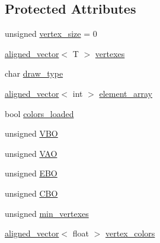 \subsection*{Protected Attributes}
\begin{DoxyCompactItemize}
\item 
unsigned \mbox{\hyperlink{classShape_a7cf9cc243cdd64215eca4d81704c7199}{vertex\+\_\+size}} = 0
\item 
\mbox{\hyperlink{type__definitions_8hpp_accb98a876f193a416d9c8a02fe22d526}{aligned\+\_\+vector}}$<$ T $>$ \mbox{\hyperlink{classShape_a50296217cf654fc7b756b67a2f0305c2}{vertexes}}
\item 
char \mbox{\hyperlink{classShape_a851fcb33238286342f670d27443ffdfc}{draw\+\_\+type}}
\item 
\mbox{\hyperlink{type__definitions_8hpp_accb98a876f193a416d9c8a02fe22d526}{aligned\+\_\+vector}}$<$ int $>$ \mbox{\hyperlink{classShape_accef3084e7e3897e01806b90da0a0ec8}{element\+\_\+array}}
\item 
bool \mbox{\hyperlink{classShape_a216866713d16c882a0f0b0b0a89d350d}{colors\+\_\+loaded}}
\item 
unsigned \mbox{\hyperlink{classShape_a5ca89aadcd89bb475d6ca88acf733ce6}{V\+BO}}
\item 
unsigned \mbox{\hyperlink{classShape_a30771567edd66db5d14dc630f2d63f82}{V\+AO}}
\item 
unsigned \mbox{\hyperlink{classShape_a95c775e548b129e23d2dd32e23fb0f3e}{E\+BO}}
\item 
unsigned \mbox{\hyperlink{classShape_a66502f6f87b46a705d131dc7b0b67d42}{C\+BO}}
\item 
unsigned \mbox{\hyperlink{classShape_acb30d3bdd3434dc2cb3074a4d61985ed}{min\+\_\+vertexes}}
\item 
\mbox{\hyperlink{type__definitions_8hpp_accb98a876f193a416d9c8a02fe22d526}{aligned\+\_\+vector}}$<$ float $>$ \mbox{\hyperlink{classShape_a1590ef02d7090f28d1ad312fd46f5030}{vertex\+\_\+colors}}
\end{DoxyCompactItemize}
